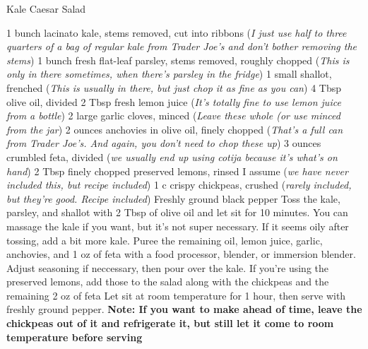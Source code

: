 \documentclass[../cookbook.tex]{subfiles}
\begin{document}
\begin{recipe}{Kale Caesar Salad}

\ingredients
{1 bunch lacinato kale, stems removed, cut into ribbons (\textit{I just use half to three quarters of a bag of regular kale from Trader Joe's and don't bother removing the stems})}
{1 bunch fresh flat-leaf parsley, stems removed, roughly chopped (\textit{This is only in there sometimes, when there's parsley in the fridge})}
{1 small shallot, frenched (\textit{This is usually in there, but just chop it as fine as you can})}
{4 Tbsp olive oil, divided}
{2 Tbsp fresh lemon juice (\textit{It's totally fine to use lemon juice from a bottle})}
{2 large garlic cloves, minced (\textit{Leave these whole (or use minced from the jar})}
{2 ounces anchovies in olive oil, finely chopped (\textit{That's a full can from Trader Joe's. And again, you don't need to chop these up})}
{3 ounces crumbled feta, divided (\textit{we usually end up using cotija because it's what's on hand})}
{2 Tbsp finely chopped preserved lemons, rinsed I assume (\textit{we have never included this, but recipe included})}
{1 c crispy chickpeas, crushed (\textit{rarely included, but they're good. Recipe included})}
{Freshly ground black pepper}
\stopingredients
\preparation
{Toss the kale, parsley, and shallot with 2 Tbsp of olive oil and let sit for 10 minutes. You can massage the kale if you want, but it's not super necessary. If it seems oily after tossing, add a bit more kale.}
{Puree the remaining oil, lemon juice, garlic, anchovies, and 1 oz of feta with a food processor, blender, or immersion blender. Adjust seasoning if neccessary, then pour over the kale.}
{If you're using the preserved lemons, add those to the salad along with the chickpeas and the remaining 2 oz of feta}
{Let sit at room temperature for 1 hour, then serve with freshly ground pepper. \textbf{Note: If you want to make ahead of time, leave the chickpeas out of it and refrigerate it, but still let it come to room temperature before serving}}
\stopprep
\end{recipe}
\end{document}
